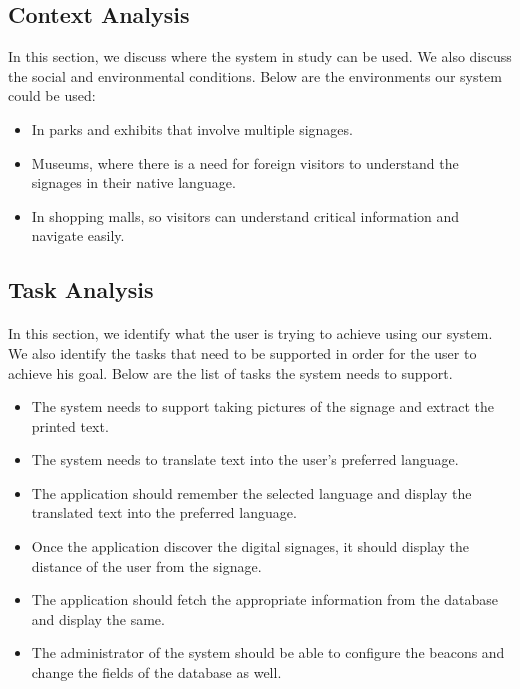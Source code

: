 \documentclass[12pt]{article}
\begin{document}
    \subsection{Context Analysis}
    
    In this section, we discuss where the system in study can be used. We also discuss the social and environmental conditions. Below are the environments our system could be used:
    
   
\begin{itemize}

 \item In parks and exhibits that involve multiple signages.
 
  \item Museums, where there is a need for foreign visitors to understand the signages in their native language.
 
  \item In shopping malls, so visitors can understand critical information and navigate easily.
  
  \end{itemize}
  

\subsection{Task Analysis}
\label{task}
\paragraph{}In this section, we identify what the user is trying to achieve using our system. We also identify the tasks that need to be supported in order for the user to achieve his goal. Below are the list of tasks the system needs to support. 

\begin{itemize}

 \item The system needs to support taking pictures of the signage and extract the printed text. 
 
  \item The system needs to translate text into the user's preferred language.
 
  \item The application should remember the selected language and display the translated text into the preferred language.
  
  \item Once the application discover the digital signages, it should display the distance of the user from the signage.
  
    \item The application should fetch the appropriate information from the database and display the same.
    
    \item The administrator of the system should be able to configure the beacons and change the fields of the database as well.
    
    \end{itemize}
    
\end{document}
